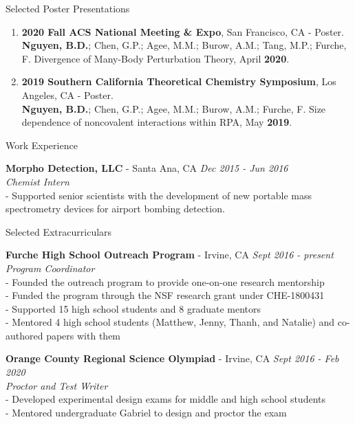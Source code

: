 \documentclass{resume} %
\begin{document}
\begin{rSection}{Selected Poster Presentations}
  \begin{enumerate}

  \item \textbf{2020 Fall ACS National Meeting \& Expo}, San Francisco, CA - Poster. \\
  \textbf{Nguyen, B.D.}; Chen, G.P.; Agee, M.M.; Burow, A.M.; Tang, M.P.;
  Furche, F. Divergence of Many-Body Perturbation Theory, April \textbf{2020}.
  
  \item \textbf{2019 Southern California Theoretical Chemistry Symposium}, Los Angeles, CA - Poster. \\
  \textbf{Nguyen, B.D.}; Chen, G.P.; Agee, M.M.; Burow, A.M.; Furche, F.  
  Size dependence of noncovalent interactions within RPA, May \textbf{2019}.
  \end{enumerate}
  
\end{rSection}

\begin{rSection}{Work Experience}

  {\bf Morpho Detection, LLC} - Santa Ana, CA \hfill {\em Dec 2015 - Jun 2016}  \\
  {\textit{Chemist Intern}} \\
  - Supported senior scientists with the development of new portable mass
  spectrometry devices for airport bombing detection. \\

\end{rSection}


\begin{rSection}{Selected Extracurriculars}

  {\bf Furche High School Outreach Program} - Irvine, CA \hfill {\em Sept 2016 - present} \\
  {\textit{Program Coordinator}} \\
  - Founded the outreach program to provide one-on-one research mentorship \\
  - Funded the program through the NSF research grant under CHE-1800431 \\
  - Supported 15 high school students and 8 graduate mentors \\
  - Mentored 4 high school students (Matthew, Jenny, Thanh, and Natalie) and co-authored papers with them

  {\bf Orange County Regional Science Olympiad} - Irvine, CA \hfill {\em Sept 2016 - Feb 2020}  \\
  {\textit{Proctor and Test Writer}} \\
  - Developed experimental design exams for middle and high school students \\
  - Mentored undergraduate Gabriel to design and proctor the exam

\end{rSection}
\end{document}
